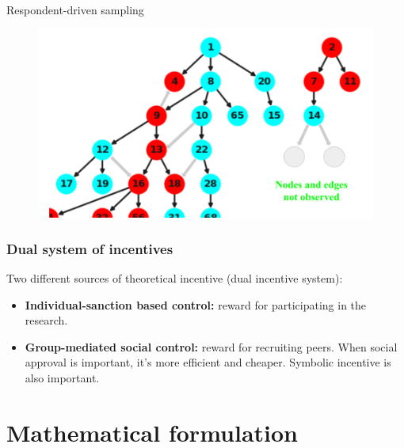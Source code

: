 \documentclass{beamer}
\newcommand{\Space}{\vspace{3ex}}
\begin{document}
\begin{frame}{Respondent-driven sampling}
\begin{figure}
\begin{overprint}
    \includegraphics[width=\textwidth]{../../images/graph-rds-harvard-4-english.png}
    \end{overprint}
  \end{figure}  
\end{frame}

\begin{frame}
  
  \frametitle{Dual system of incentives}
    
  Two different sources of theoretical incentive (dual incentive system):

  \Space

  \begin{itemize}
    \justifying
    \item<1> {\bf Individual-sanction based control:} reward for participating
    in the research. 

    \Space

    \item<2> {\bf Group-mediated social control:} reward for recruiting peers.
    When social approval is important, it's more efficient and cheaper.
    Symbolic incentive is also important. 
  \end{itemize}

\end{frame}


\section{Mathematical formulation}
\end{document}
